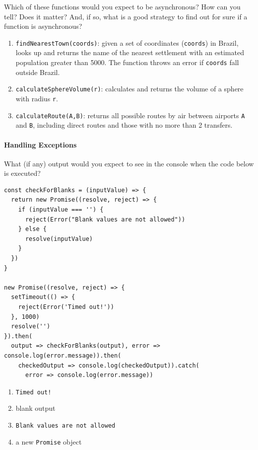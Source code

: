 Which of these functions would you expect to be asynchronous? How can
you tell? Does it matter? And, if so, what is a good strategy to find
out for sure if a function is asynchronous?

\begin{enumerate}
\tightlist
\item
  \texttt{findNearestTown(coords)}: given a set of coordinates
  (\texttt{coords}) in Brazil, looks up and returns the name of the
  nearest settlement with an estimated population greater than 5000. The
  function throws an error if \texttt{coords} fall outside Brazil.
\item
  \texttt{calculateSphereVolume(r)}: calculates and returns the volume
  of a sphere with radius \texttt{r}.
\item
  \texttt{calculateRoute(A,B)}: returns all possible routes by air
  between airports \texttt{A} and \texttt{B}, including direct routes
  and those with no more than 2 transfers.
\end{enumerate}

\paragraph{Handling Exceptions}\label{handling-exceptions}

What (if any) output would you expect to see in the console when the
code below is executed?

\begin{verbatim}
const checkForBlanks = (inputValue) => {
  return new Promise((resolve, reject) => {
    if (inputValue === '') {
      reject(Error("Blank values are not allowed"))
    } else {
      resolve(inputValue)
    }
  })
}

new Promise((resolve, reject) => {
  setTimeout(() => {
    reject(Error('Timed out!'))
  }, 1000)
  resolve('')
}).then(
  output => checkForBlanks(output), error => console.log(error.message)).then(
    checkedOutput => console.log(checkedOutput)).catch(
      error => console.log(error.message))
\end{verbatim}

\begin{enumerate}
\tightlist
\item
  \texttt{Timed\ out!}
\item
  blank output
\item
  \texttt{Blank\ values\ are\ not\ allowed}
\item
  a new \texttt{Promise} object
\end{enumerate}

